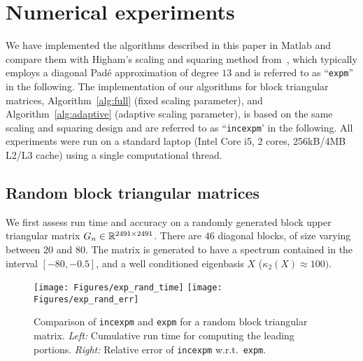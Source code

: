 \section{Numerical experiments}
\label{sec:numerical_experiments}

We have implemented the algorithms described in this paper in {\sc
Matlab} and compare them with Higham's scaling and squaring method
from~\cite{Higham2009}, which typically employs a diagonal Pad\'e
approximation of degree $13$ and is referred to as ``\texttt{expm}''
in the following. The implementation of our algorithms for block
triangular matrices, Algorithm~\ref{alg:full} (fixed scaling
parameter), and Algorithm~\ref{alg:adaptive} (adaptive scaling
parameter), is based on the same scaling and squaring design and are
referred to as ``\texttt{incexpm}' in the following.  All experiments
were run on a standard laptop (Intel Core i5, 2 cores, 256kB/4MB L2/L3
cache) using a single computational thread.

\subsection{Random block triangular matrices}
\label{sec:random}

We first assess run time and accuracy on a randomly generated block
upper triangular matrix $G_n \in {\mathbb R}^{2491\times 2491}$.  There are $46$ diagonal
blocks, of size varying between $20$ and $80$.  The matrix is
generated to have a spectrum contained in the interval $[-80, -0.5]$,
and a well conditioned eigenbasis $X$ ($\kappa_2(X) \approx 100)$.

\begin{figure}[t]
\centering
    \texttt{[image: Figures/exp\_rand\_time]}
    \hfill
    \texttt{[image: Figures/exp\_rand\_err]}
    \caption{Comparison of \texttt{incexpm} and \texttt{expm} for a
    random block triangular matrix.  \emph{Left:} Cumulative run time
    for computing the leading portions. \emph{Right:} Relative error
    of \texttt{incexpm} w.r.t.~\texttt{expm}.\label{fig:exp_random}}
\end{figure}

